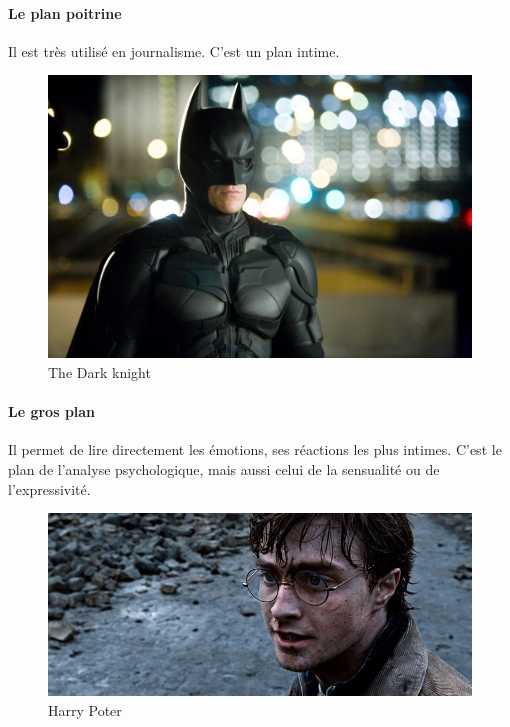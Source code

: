 \documentclass{article}
\begin{document}
\clearpage

	\paragraph{Le plan poitrine} Il est très utilisé en journalisme. C'est un plan intime.

\begin{figure}[h]
\centering
\includegraphics[scale=0.15]{img/plan7.png}
\caption{The Dark knight}
\label{fig:regle_tiers}
\end{figure}

	\paragraph{Le gros plan} Il permet de lire directement les émotions, ses réactions les plus intimes. C'est le plan de l'analyse psychologique, mais aussi celui de la sensualité ou de l'expressivité.

\begin{figure}[h]
\centering
\includegraphics[scale=0.3]{img/plan8.jpg}
\caption{Harry Poter}
\label{fig:regle_tiers}
\end{figure}
\end{document}
